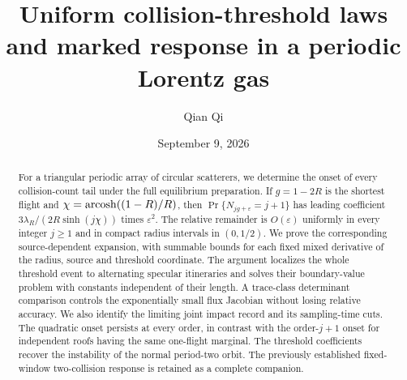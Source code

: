 
\title[Uniform collision-threshold laws]{Uniform collision-threshold laws and marked response
 in a periodic Lorentz gas}
\author{Qian Qi}
\date{September 9, 2026}

\begin{abstract}
For a triangular periodic array of circular scatterers, we determine the
onset of every collision-count tail under the full equilibrium preparation.
If $g=1-2R$ is the shortest flight and $\chi=\operatorname{arcosh}((1-R)/R)$, then
$\Pr\{N_{jg+\varepsilon}=j+1\}$ has leading coefficient
$3\lambda_R/(2R\sinh(j\chi))$ times $\varepsilon^2$.
The relative remainder is $O(\varepsilon)$ uniformly in every integer
$j\ge1$ and in compact radius intervals in $(0,1/2)$.
We prove the corresponding source-dependent expansion, with summable
bounds for each fixed mixed derivative of the radius, source and threshold
coordinate. The argument localizes the whole threshold event to alternating
specular itineraries and solves their boundary-value problem with constants
independent of their length. A trace-class determinant comparison controls
the exponentially small flux Jacobian without losing relative accuracy.
We also identify the limiting joint impact record and its sampling-time cuts.
The quadratic onset persists at every order, in contrast with the
order-$j+1$ onset for independent roofs having the same one-flight marginal.
The threshold coefficients recover the instability of the normal period-two
orbit. The previously established fixed-window two-collision response is
retained as a complete companion.
\end{abstract}
\maketitle










